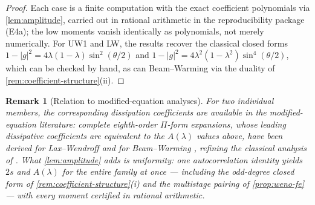 \documentclass[pdflatex,sn-mathphys-num]{sn-jnl}%
\theoremstyle{thmstyleone}%
\theoremstyle{thmstyletwo}%
\newtheorem{remark}{Remark}%
\theoremstyle{thmstylethree}%
\begin{document}
\begin{proof}
Each case is a finite computation with the exact coefficient polynomials via \cref{lem:amplitude}, carried out in rational arithmetic in the reproducibility package (E4a); the low moments vanish identically as polynomials, not merely numerically.
For UW1 and LW, the results recover the classical closed forms $1-|g|^2=4\lambda(1-\lambda)\sin^2(\theta/2)$ and $1-|g|^2=4\lambda^2(1-\lambda^2)\sin^4(\theta/2)$, which can be checked by hand, as can Beam--Warming via the duality of \cref{rem:coefficient-structure}(ii).
\end{proof}

\begin{remark}[Relation to modified-equation analyses]\label{rem:mde-prior}
For two individual members, the corresponding dissipation coefficients are available in the modified-equation literature: complete eighth-order $\Pi$-form expansions, whose leading dissipative coefficients are equivalent to the $A(\lambda)$ values above, have been derived for Lax--Wendroff \cite{WinnickiJasinskiPietrek2019} and for Beam--Warming \cite{ShokinWinnickiJasinskiPietrek2020}, refining the classical analysis of \cite{WarmingHyett1974}.
What \cref{lem:amplitude} adds is uniformity: one autocorrelation identity yields $2s$ and $A(\lambda)$ for the entire family at once --- including the odd-degree closed form of \cref{rem:coefficient-structure}(i) and the multistage pairing of \cref{prop:weno-fe} --- with every moment certified in rational arithmetic.
\end{remark}
\end{document}

